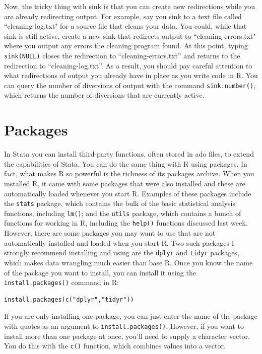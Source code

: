 \documentclass[12pt, oneside]{amsart}   	%
\begin{document}
Now, the tricky thing with sink is that you can create new redirections while you are already redirecting output. For example, say you sink to a text file called ``cleaning-log.txt" for a source file that cleans your data. You could, while that sink is still active, create a new sink that redirects output to ``cleaning-errors.txt" where you output any errors the cleaning program found. At this point, typing \texttt{sink(NULL)} closes the redirection to ``cleaning-errors.txt'' and returns to the redirection to ``cleaning-log.txt''. As a result, you should pay careful attention to what redirections of output you already have in place as you write code in R. You can query the number of diversions of output with the command \texttt{sink.number()}, which returns the number of diversions that are currently active. 

\section{Packages}

In Stata you can install third-party functions, often stored in ado files, to extend the capabilities of Stata. You can do the same thing with R using packages. In fact, what makes R so powerful is the richness of its packages archive. When you installed R, it came with some packages that were also installed and these are automatically loaded whenever you start R. Examples of these packages include the \texttt{stats} package, which contains the bulk of the basic statistical analysis functions, including \texttt{lm()}; and the \texttt{utils} package, which contains a bunch of functions for working in R, including the \texttt{help()} functions discussed last week. However, there are some packages you may want to use that are not automatically installed and loaded when you start R. Two such packages I strongly recommend installing and using are the \texttt{dplyr} and \texttt{tidyr} packages, which makes data wrangling much easier than base R. Once you know the name of the package you want to install, you can install it using the \texttt{install.packages()} command in R:

\begin{verbatim}
install.packages(c("dplyr","tidyr"))
\end{verbatim}

If you are only installing one package, you can just enter the name of the package with quotes as an argument to \texttt{install.packages()}. However, if you want to install more than one package at once, you'll need to supply a character vector. You do this with the \texttt{c()} function, which combines values into a vector. 
\end{document}
